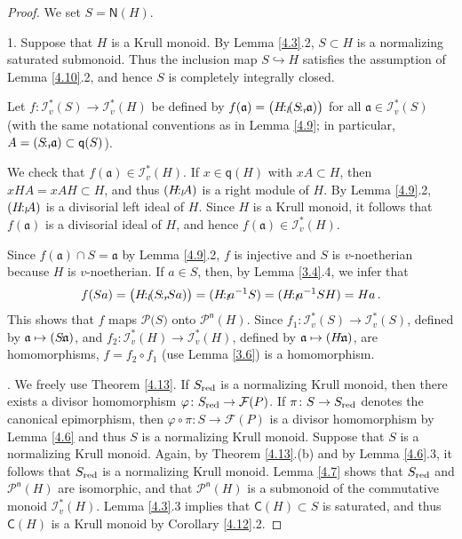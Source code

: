 \documentclass[a4paper]{amsart}
\theoremstyle{definition}
\numberwithin{equation}{section}
\begin{document}
\begin{proof}
We set $S = \mathsf N (H)$.

1. Suppose that $H$ is a Krull monoid. By Lemma \ref{4.3}.2, $S \subset H$ is a normalizing saturated
submonoid. Thus the inclusion map $S \hookrightarrow H$ satisfies
the assumption of Lemma \ref{4.10}.2, and hence $S$ is completely
integrally closed.

Let $f \colon \mathcal I_v^* ( S )
      \to \mathcal I_v^* (H)$ be defined by $f ( \mathfrak a) =
      \big( H {\negthinspace :_l \negthinspace} (S {\negthinspace :_r \negthinspace} \mathfrak a) \big)$ for all $\mathfrak a
      \in \mathcal I_v^* (S)$ (with the same notational conventions
      as in Lemma \ref{4.9}; in particular, $A = (S {\negthinspace :_r \negthinspace} \mathfrak
      a) \subset \mathsf q (S)$).

We check that $f (\mathfrak a) \in \mathcal I_v^* (H)$. If $x \in
\mathsf q (H)$ with $xA \subset H$, then $xHA = xAH \subset H$, and
thus $(H {\negthinspace :_l \negthinspace} A)$ is a right module of $H$. By Lemma \ref{4.9}.2,
$(H {\negthinspace :_l \negthinspace} A)$ is a divisorial left ideal of $H$. Since $H$ is a Krull
monoid, it follows that $f ( \mathfrak a)$ is a divisorial ideal of
$H$, and hence $f (\mathfrak a) \in \mathcal I_v^* (H)$.

Since $f (\mathfrak a) \cap S = \mathfrak a$ by Lemma \ref{4.9}.2,
$f$ is injective and $S$ is $v$-noetherian because $H$ is
$v$-noetherian. If $a \in S$, then, by  Lemma \ref{3.4}.4, we infer
that
\[
f (Sa) = \big( H {\negthinspace :_l \negthinspace} (S {\negthinspace :_r \negthinspace}   Sa) \big) = ( H {\negthinspace :_l \negthinspace} a^{-1}S ) = ( H
{\negthinspace :_l \negthinspace} a^{-1}SH ) = Ha \,.
\]
This shows that $f$ maps $\mathcal P \big( S \big)$ onto $\mathcal
P^{\mathsf n} (H)$. Since $f_1 \colon \mathcal I_v^* (S) \to
\mathcal I_v^* (S)$, defined by $\mathfrak a \mapsto (S {\negthinspace : \negthinspace}
\mathfrak a)$, and $f_2 \colon \mathcal I_v^* (H) \to \mathcal I_v^*
(H)$, defined by $\mathfrak a \mapsto (H {\negthinspace : \negthinspace} \mathfrak a)$, are
homomorphisms, $f = f_2 \circ f_1$ (use Lemma \ref{3.6}) is a
homomorphism.

. We freely use Theorem \ref{4.13}. If $S_{{\text{\rm red}}}$ is a normalizing Krull monoid, then there exists a divisor homomorphism $\varphi \colon S_{{\text{\rm red}}} \to \mathcal F (P)$. If $\pi \colon S \to S_{{\text{\rm red}}}$ denotes the canonical epimorphism, then $\varphi \circ \pi \colon S \to \mathcal F (P)$ is a divisor homomorphism by Lemma \ref{4.6} and thus $S$ is a normalizing Krull monoid. Suppose that $S$ is a normalizing Krull monoid. Again, by Theorem \ref{4.13}.(b) and by Lemma \ref{4.6}.3, it follows that $S_{{\text{\rm red}}}$ is a normalizing Krull monoid. Lemma \ref{4.7} shows that $S_{{\text{\rm red}}}$ and $\mathcal P^{\mathsf n} (H)$ are isomorphic, and that $\mathcal P^{\mathsf n} (H)$ is a submonoid of the commutative monoid $\mathcal I_v^* (H)$. Lemma \ref{4.3}.3 implies that $\mathsf C (H) \subset S$ is saturated, and thus $\mathsf C (H)$ is a Krull monoid  by Corollary \ref{4.12}.2.
\end{proof}
\end{document}
